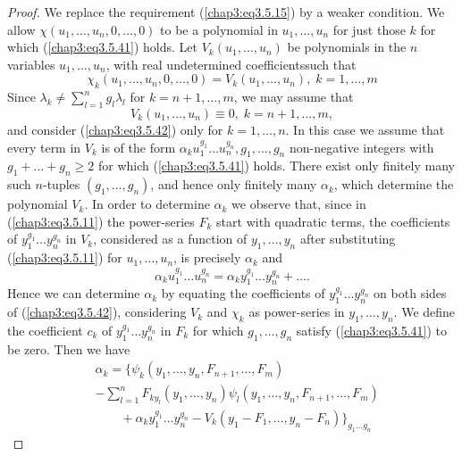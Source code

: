 \begin{proof}
We replace the requirement (\ref{chap3:eq3.5.15}) by a weaker
condition. We allow $\chi (u_1, \ldots, u_n, 0, \ldots, 0)$ to be a
polynomial in $u_1, \ldots, u_n$ for just those $k$ for which
(\ref{chap3:eq3.5.41}) holds. Let $V_k(u_1, \ldots, u_n)$ be
polynomials in the $n$ variables $u_1, \ldots, u_n$, with real
undetermined coefficients\pageoriginale such that  
\begin{equation*}
\chi_k (u_1, \ldots, u_n, 0, \ldots, 0) = V_k (u_1, \ldots, u_n), \; k
=1, \ldots, m  
\tag{3.5.42}\label{chap3:eq3.5.42}
\end{equation*}
Since $\lambda_k \neq \sum\limits^n_{l=1} g_l \lambda_l$ for $k = n
+1, \ldots, m$, we may assume that  
\begin{equation*}
V_k(u_1, \ldots, u_n) \equiv 0, \; k = n+1, \ldots, m,
\tag{3.5.43}\label{chap3:eq3.5.43} 
\end{equation*}
and consider (\ref{chap3:eq3.5.42}) only for $k =1, \ldots, n$. In
this case we assume that every term in $V_k$ is of the form $\alpha_k
u^{g_1}_1 \ldots u^{g_n}_n, g_1, \ldots, g_n$ non-negative integers
with $g_1 + \ldots + g_n \geq 2$ for which (\ref{chap3:eq3.5.41})
holds. There exist only finitely many such $n$-tuples $(g_1, \ldots,
g_n)$, and hence only finitely many $\alpha_k$, which determine the
polynomial $V_k$. In order to determine $\alpha_k$ we observe that,
since in (\ref{chap3:eq3.5.11}) the power-series $F_k$ start with
quadratic terms, the coefficients of $y^{g_1}_1 \ldots y^{g_n}_n$ in
$V_k$, considered as a function of $y_1, \ldots, y_n$ after
substituting (\ref{chap3:eq3.5.11}) for $u_1,\ldots, u_n$, is
precisely $\alpha_k$ and  
$$
\alpha_k u^{g_1}_1 \ldots u^{g_n}_n = \alpha_k y^{g_1}_1 \ldots
y^{g_n}_n + \ldots .  
$$
Hence we can determine $\alpha_k$ by equating the coefficients of
$y^{g_1}_1 \ldots y^{g_n}_n$ on both sides of (\ref{chap3:eq3.5.42}),
considering $V_k$ and $\chi_{k}$ as power-series in $y_1, \ldots,
y_n$. We define the coefficient $c_k$ of $y^{g_1}_1 \ldots y^{g_n}_n$
in $F_k$ for which $g_1, \ldots, g_n$ satisfy (\ref{chap3:eq3.5.41})
to be zero. Then we have  
\begin{align*}
& \alpha_k = \Big\{\psi_k (y_1 , \ldots, y_n, F_{n+1}, \ldots, 
  F_m)\\ 
& -  \sum\limits^n_{l=1} F_{ky_l} (y_1, \ldots, y_n) \psi_l (y_1,
  \ldots, 
  y_n, F_{n+1}, \ldots, F_m)\\ 
& \qquad + \alpha_k y^{g_1}_1 \ldots y^{g_n}_n - V_k (y_1 - F_1,
  \ldots, y_n - F_n)  
\Big\}_{g_1 \ldots g_n} \tag{3.5.44}\label{chap3:eq3.5.44}

\end{align*}
\end{proof}
